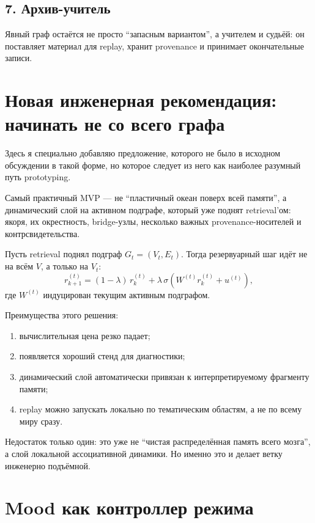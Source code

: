 \subsection*{7. Архив-учитель}
Явный граф остаётся не просто ``запасным вариантом'', а учителем и судьёй: он
поставляет материал для replay, хранит provenance и принимает окончательные записи.

\section{Новая инженерная рекомендация: начинать не со всего графа}

Здесь я специально добавляю предложение, которого не было в исходном обсуждении в такой
форме, но которое следует из него как наиболее разумный путь prototyping.

\begin{principle}
Самый практичный MVP — не ``пластичный океан поверх всей памяти'', а динамический слой
на активном подграфе, который уже поднят retrieval'ом: якоря, их окрестность, bridge-узлы,
несколько важных provenance-носителей и контрсвидетельства.
\end{principle}

Пусть retrieval поднял подграф $G_t=(V_t,E_t)$. Тогда резервуарный шаг идёт не на всём
$V$, а только на $V_t$:
\[
r^{(t)}_{k+1}
=(1-\lambda)\,r^{(t)}_k + \lambda\,\sigma(W^{(t)} r^{(t)}_k + u^{(t)}),
\]
где $W^{(t)}$ индуцирован текущим активным подграфом.

Преимущества этого решения:
\begin{enumerate}
\item вычислительная цена резко падает;
\item появляется хороший стенд для диагностики;
\item динамический слой автоматически привязан к интерпретируемому фрагменту памяти;
\item replay можно запускать локально по тематическим областям, а не по всему миру сразу.
\end{enumerate}

Недостаток только один: это уже не ``чистая распределённая память всего мозга'', а
слой локальной ассоциативной динамики. Но именно это и делает ветку инженерно подъёмной.

\section{Mood как контроллер режима}

